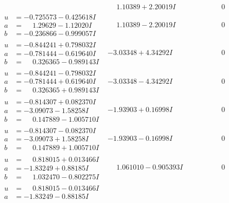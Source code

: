 \documentclass[1p]{elsarticle_modified}
\theoremstyle{definition}
\begin{document}
$$\begin{array}{c|c|c}
 & \phantom{-}1.10389 + 2.20019 I & \phantom{-0.000000 } 0 \\ \hline\begin{aligned}
u &= -0.725573 - 0.425618 I \\
a &= \phantom{-}1.29629 - 1.12020 I \\
b &= -0.236866 - 0.999057 I\end{aligned}
 & \phantom{-}1.10389 - 2.20019 I & \phantom{-0.000000 } 0 \\ \hline\begin{aligned}
u &= -0.844241 + 0.798032 I \\
a &= -0.781444 - 0.619640 I \\
b &= \phantom{-}0.326365 - 0.989143 I\end{aligned}
 & -3.03348 + 4.34292 I & \phantom{-0.000000 } 0 \\ \hline\begin{aligned}
u &= -0.844241 - 0.798032 I \\
a &= -0.781444 + 0.619640 I \\
b &= \phantom{-}0.326365 + 0.989143 I\end{aligned}
 & -3.03348 - 4.34292 I & \phantom{-0.000000 } 0 \\ \hline\begin{aligned}
u &= -0.814307 + 0.082370 I \\
a &= -3.09073 - 1.58258 I \\
b &= \phantom{-}0.147889 - 1.005710 I\end{aligned}
 & -1.93903 + 0.16998 I & \phantom{-0.000000 } 0 \\ \hline\begin{aligned}
u &= -0.814307 - 0.082370 I \\
a &= -3.09073 + 1.58258 I \\
b &= \phantom{-}0.147889 + 1.005710 I\end{aligned}
 & -1.93903 - 0.16998 I & \phantom{-0.000000 } 0 \\ \hline\begin{aligned}
u &= \phantom{-}0.818015 + 0.013466 I \\
a &= -1.83249 + 0.88185 I \\
b &= \phantom{-}1.032470 - 0.802275 I\end{aligned}
 & \phantom{-}1.061010 - 0.905393 I & \phantom{-0.000000 } 0 \\ \hline\begin{aligned}
u &= \phantom{-}0.818015 - 0.013466 I \\
a &= -1.83249 - 0.88185 I \\

\end{aligned}
\end{array}$$
\end{document}
